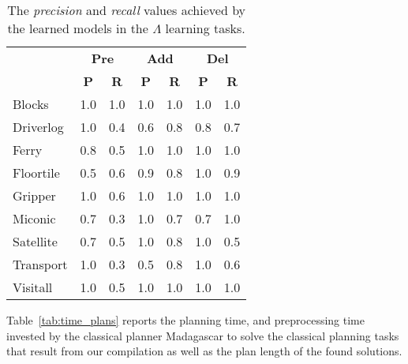 \documentclass[letterpaper]{article} %
\begin{document}
\begin{table}[hbt!]
	\begin{small}
	\begin{center}
		\begin{tabular}{l|l|l|l|l|l|l|}
			 & \multicolumn{2}{|c|}{\bf Pre} & \multicolumn{2}{|c|}{\bf Add} & \multicolumn{2}{|c|}{\bf Del}  \\ \cline{2-7}			 
			  & \multicolumn{1}{|c|}{\bf P} & \multicolumn{1}{|c|}{\bf R} & \multicolumn{1}{|c|}{\bf P} & \multicolumn{1}{|c|}{\bf R} & \multicolumn{1}{|c|}{\bf P} & \multicolumn{1}{|c|}{\bf R} \\
			\hline
			Blocks & 1.0 & 1.0 & 1.0 & 1.0 & 1.0 & 1.0 \\
			Driverlog & 1.0 & 0.4 & 0.6 & 0.8 & 0.8 & 0.7 \\
			Ferry & 0.8 & 0.5 & 1.0 & 1.0 & 1.0 & 1.0 \\
			Floortile & 0.5 & 0.6 & 0.9 & 0.8 & 1.0 & 0.9 \\
			Gripper & 1.0 & 0.6 & 1.0 & 1.0 & 1.0 & 1.0 \\
			Miconic & 0.7 & 0.3 & 1.0 & 0.7 & 0.7 & 1.0 \\
			Satellite & 0.7 & 0.5 & 1.0 & 0.8 & 1.0 & 0.5 \\
			Transport & 1.0 & 0.3 & 0.5 & 0.8 & 1.0 & 0.6 \\
			Visitall & 1.0 & 0.5 & 1.0 & 1.0 & 1.0 & 1.0 
		\end{tabular}
	\end{center}
	\end{small}
\caption{\small The {\em precision} and {\em recall} values achieved by the learned models in the $\Lambda$ learning tasks.}
\label{tab:results_plans}
\end{table}

Table~\ref{tab:time_plans} reports the planning time, and preprocessing time invested by the classical planner {\sc Madagascar} to solve the classical planning tasks that result from our compilation as well as the plan length of the found solutions. 	
\end{document}
